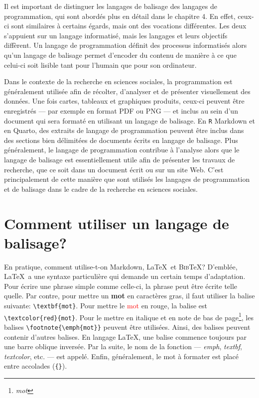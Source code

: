 \documentclass[
  letterpaper,
]{scrbook}
\begin{document}
Il est important de distinguer les langages de balisage des langages de
programmation, qui sont abordés plus en détail dans le chapitre 4. En
effet, ceux-ci sont similaires à certains égards, mais ont des vocations
différentes. Les deux s'appuient sur un langage informatisé, mais les
langages et leurs objectifs diffèrent. Un langage de programmation
définit des processus informatisés alors qu'un langage de balisage
permet d'encoder du contenu de manière à ce que celui-ci soit lisible
tant pour l'humain que pour son ordinateur.

Dans le contexte de la recherche en sciences sociales, la programmation
est généralement utilisée afin de récolter, d'analyser et de présenter
visuellement des données. Une fois cartes, tableaux et graphiques
produits, ceux-ci peuvent être enregistrés --- par exemple en format PDF
ou PNG --- et inclus au sein d'un document qui sera formaté en utilisant
un langage de balisage. En \texttt{R} Markdown et en Quarto, des
extraits de langage de programmation peuvent être inclus dans des
sections bien délimitées de documents écrits en langage de balisage.
Plus généralement, le langage de programmation contribue à l'analyse
alors que le langage de balisage est essentiellement utile afin de
présenter les travaux de recherche, que ce soit dans un document écrit
ou sur un site Web. C'est principalement de cette manière que sont
utilisés les langages de programmation et de balisage dans le cadre de
la recherche en sciences sociales.

\hypertarget{comment-utiliser-un-langage-de-balisage}{%
\section{Comment utiliser un langage de
balisage?}\label{comment-utiliser-un-langage-de-balisage}}

En pratique, comment utilise-t-on Markdown, \LaTeX~et \textsc{Bib}\TeX?
D'emblée, \LaTeX~a une syntaxe particulière qui demande un certain temps
d'adaptation. Pour écrire une phrase simple comme celle-ci, la phrase
peut être écrite telle quelle. Par contre, pour mettre un \textbf{mot}
en caractères gras, il faut utiliser la balise suivante:
\texttt{\textbackslash{}textbf\{mot\}}. Pour mettre le
\textcolor{red}{mot} en rouge, la balise est
\texttt{\textbackslash{}textcolor\{red\}\{mot\}}. Pour le mettre en
italique et en note de bas de page\footnote{\emph{mot}}, les balises
\texttt{\textbackslash{}footnote\{\textbackslash{}emph\{mot\}\}} peuvent
être utilisées. Ainsi, des balises peuvent contenir d'autres balises. En
langage \LaTeX, une balise commence toujours par une barre oblique
inversée. Par la suite, le nom de la fonction --- \emph{emph},
\emph{textbf}, \emph{textcolor}, etc. --- est appelé. Enfin,
généralement, le mot à formater est placé entre accolades
(\texttt{\{\}}).
\end{document}
